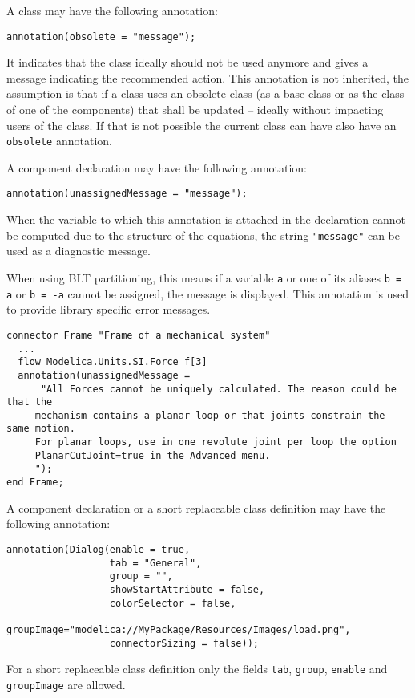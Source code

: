 A class may have the following annotation:
\begin{lstlisting}[language=modelica]
annotation(obsolete = "message");
\end{lstlisting}

It indicates that the class ideally should not be used anymore and gives a message indicating the recommended action.  This annotation is not inherited, the assumption is that if a class uses an obsolete class (as a base-class or as the class of one of the components) that shall be updated -- ideally without impacting users of the class.  If that is not possible the current class can have also have an \lstinline!obsolete! annotation.

A component declaration may have the following annotation:
\begin{lstlisting}[language=modelica]
annotation(unassignedMessage = "message");
\end{lstlisting}

When the variable to which this annotation is attached in the declaration cannot be computed due to the structure of the equations, the string \lstinline!"message"! can be used as a diagnostic message.

\begin{nonnormative}
When using BLT partitioning, this means if a variable \lstinline!a! or one of its aliases \lstinline!b = a! or \lstinline!b = -a!
cannot be assigned, the message is displayed.  This annotation is used to provide library specific error messages.
\end{nonnormative}

\begin{example}
\begin{lstlisting}[language=modelica]
connector Frame "Frame of a mechanical system"
  ...
  flow Modelica.Units.SI.Force f[3]
  annotation(unassignedMessage =
      "All Forces cannot be uniquely calculated. The reason could be that the
     mechanism contains a planar loop or that joints constrain the same motion.
     For planar loops, use in one revolute joint per loop the option
     PlanarCutJoint=true in the Advanced menu.
     ");
end Frame;
\end{lstlisting}
\end{example}

A component declaration or a short replaceable class definition may have the following annotation:
\begin{lstlisting}[language=modelica]
annotation(Dialog(enable = true,
                  tab = "General",
                  group = "",
                  showStartAttribute = false,
                  colorSelector = false,
                  groupImage="modelica://MyPackage/Resources/Images/load.png",
                  connectorSizing = false));
\end{lstlisting}
For a short replaceable class definition only the fields \lstinline!tab!, \lstinline!group!, \lstinline!enable! and
\lstinline!groupImage! are allowed.


